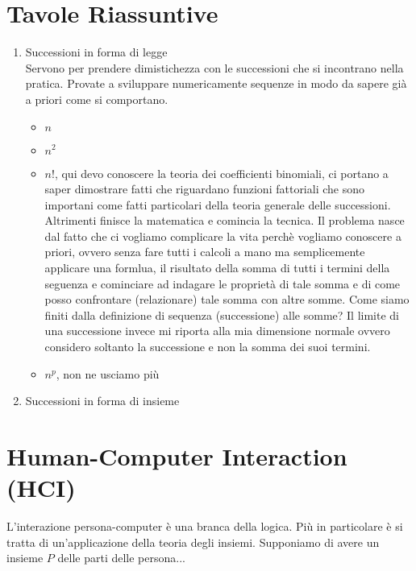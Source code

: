 \documentclass[]{article}
\begin{document}
\section{Tavole Riassuntive}
\begin{enumerate}
	\item Successioni in forma di legge \\
	Servono per prendere dimistichezza con le successioni che si incontrano nella pratica. Provate a sviluppare numericamente sequenze in modo da sapere gi\`a a priori come si comportano.
		\begin{itemize}
			\item $n$
			\item $n^2$
			\item $n!$, qui devo conoscere la teoria dei coefficienti binomiali, ci portano a saper dimostrare fatti che riguardano funzioni fattoriali che sono importani come fatti particolari della teoria generale delle successioni. Altrimenti finisce la matematica e comincia la tecnica. Il problema nasce dal fatto che ci vogliamo complicare la vita perch\`e vogliamo conoscere a priori, ovvero senza fare tutti i calcoli a mano ma semplicemente applicare una formlua, il risultato della somma di tutti i termini della seguenza e cominciare ad indagare le propriet\`a di tale somma e di come posso confrontare (relazionare) tale somma con altre somme. Come siamo finiti dalla definizione di sequenza (successione) alle somme? Il limite di una successione invece mi riporta alla mia dimensione normale ovvero considero soltanto la successione e non la somma dei suoi termini.
			\item $n^p$, non ne usciamo pi\`u
		\end{itemize}
	\item Successioni in forma di insieme \\
\end{enumerate}

\section{Human-Computer Interaction (HCI)}
L'interazione persona-computer \`e una branca della logica. Pi\`u in particolare \`e si tratta di un'applicazione della teoria degli insiemi. Supponiamo di avere un insieme $P$ delle parti delle persona... 
\end{document}
